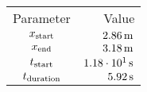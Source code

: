 \begin{tabular}{cr}
    \toprule
    Parameter & Value \\ \otoprule
    $x_{\textup{start}}$    & $\unit[2.86]{m}$ \\
    $x_{\textup{end}}$      & $\unit[3.18]{m}$ \\
    $t_{\textup{start}}$    & $\unit[1.18 \cdot 10^{1}]{s}$ \\
    $t_{\textup{duration}}$ & $\unit[5.92]{s}$ \\
    \bottomrule
\end{tabular}
